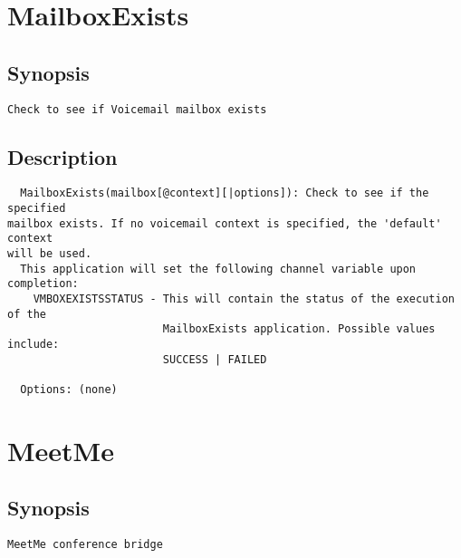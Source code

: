 \section{MailboxExists}
\subsection{Synopsis}
\begin{verbatim}
Check to see if Voicemail mailbox exists
\end{verbatim}
\subsection{Description}
\begin{verbatim}
  MailboxExists(mailbox[@context][|options]): Check to see if the specified
mailbox exists. If no voicemail context is specified, the 'default' context
will be used.
  This application will set the following channel variable upon completion:
    VMBOXEXISTSSTATUS - This will contain the status of the execution of the
                        MailboxExists application. Possible values include:
                        SUCCESS | FAILED

  Options: (none)

\end{verbatim}


\section{MeetMe}
\subsection{Synopsis}
\begin{verbatim}
MeetMe conference bridge
\end{verbatim}
